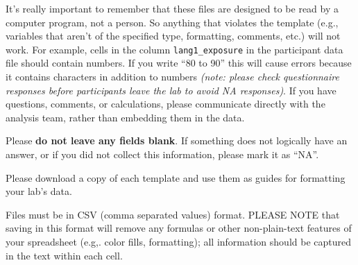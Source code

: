 \documentclass[
  letterpaper,
  DIV=11,
  numbers=noendperiod,
  oneside]{scrreprt}
\begin{document}
\begin{tcolorbox}[enhanced jigsaw, coltitle=black, colframe=quarto-callout-caution-color-frame, titlerule=0mm, colback=white, arc=.35mm, toprule=.15mm, left=2mm, colbacktitle=quarto-callout-caution-color!10!white, opacityback=0, bottomtitle=1mm, title=\textcolor{quarto-callout-caution-color}{\faFire}\hspace{0.5em}{IMPORTANT NOTE \#3}, breakable, rightrule=.15mm, opacitybacktitle=0.6, toptitle=1mm, leftrule=.75mm, bottomrule=.15mm]

It's really important to remember that these files are designed to be
read by a computer program, not a person. So anything that violates the
template (e.g., variables that aren't of the specified type, formatting,
comments, etc.) will not work. For example, cells in the column
\texttt{lang1\_exposure} in the participant data file should contain
numbers. If you write ``80 to 90'' this will cause errors because it
contains characters in addition to numbers \emph{(note: please check
questionnaire responses before participants leave the lab to avoid NA
responses)}. If you have questions, comments, or calculations, please
communicate directly with the analysis team, rather than embedding them
in the data.

\end{tcolorbox}

\begin{tcolorbox}[enhanced jigsaw, coltitle=black, colframe=quarto-callout-caution-color-frame, titlerule=0mm, colback=white, arc=.35mm, toprule=.15mm, left=2mm, colbacktitle=quarto-callout-caution-color!10!white, opacityback=0, bottomtitle=1mm, title=\textcolor{quarto-callout-caution-color}{\faFire}\hspace{0.5em}{IMPORTANT NOTE \#4}, breakable, rightrule=.15mm, opacitybacktitle=0.6, toptitle=1mm, leftrule=.75mm, bottomrule=.15mm]

Please \textbf{do not leave any fields blank}. If something does not
logically have an answer, or if you did not collect this information,
please mark it as ``NA''.

\end{tcolorbox}

Please download a copy of each template and use them as guides for
formatting your lab's data.

Files must be in CSV (comma separated values) format. PLEASE NOTE that
saving in this format will remove any formulas or other non-plain-text
features of your spreadsheet (e.g,. color fills, formatting); all
information should be captured in the text within each cell.
\end{document}
